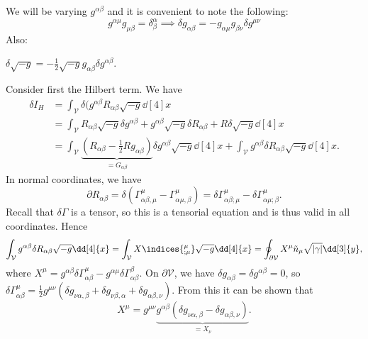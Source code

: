 \documentclass{jknotes}
\begin{document}
We will be varying \(g^{\alpha\beta}\) and it is convenient to note the following:
\begin{equation}
    g^{\alpha\mu}g_{\mu\beta} = \delta^\alpha_\beta \implies \delta g_{\alpha\beta} = -g_{\alpha\mu}g_{\beta\nu}\delta g^{\mu\nu}
\end{equation}
Also:
\begin{lemma}
    \(\delta\sqrt{-g} = -\frac12\sqrt{-g}g_{\alpha\beta}\delta g^{\alpha\beta}\).
\end{lemma}

Consider first the Hilbert term. We have
\begin{align}
    \delta I_H &= \int_{\mathcal{V}} \delta(g^{\alpha\beta}R_{\alpha\beta}\sqrt{-g}\dd[4]{x} \\
               &= \int_{\mathcal{V}} R_{\alpha\beta} \sqrt{-g} \delta g^{\alpha\beta} + g^{\alpha\beta}\sqrt{-g}\delta R_{\alpha\beta} + R \delta\sqrt{-g}\dd[4]{x} \\
               &= \int_{\mathcal{V}} \underbrace{(R_{\alpha\beta}-\frac12 R g_{\alpha\beta})}_{=G_{\alpha\beta}}\delta g^{\alpha\beta}\sqrt{-g}\dd[4]{x} + \int_{\mathcal{V}}g^{\alpha\beta}\delta R_{\alpha\beta}\sqrt{-g}\dd[4]{x}.
\end{align}
In normal coordinates, we have
\begin{equation}
    \partial R_{\alpha\beta} = \delta(\Gamma^\mu_{\alpha\beta,\mu} - \Gamma^\mu_{\alpha\mu,\beta}) = \delta\Gamma^\mu_{\alpha\beta;\mu} - \delta\Gamma^\mu_{\alpha\mu;\beta}.
\end{equation}
Recall that \(\delta\Gamma\) is a tensor, so this is a tensorial equation and is thus valid in all coordinates. Hence
\begin{equation}
    \int_{\mathcal{V}}g^{\alpha\beta}\delta R_{\alpha\beta}\sqrt{-g}\dd[4]{x} = \int_{\mathcal{V}} X\indices{^\mu_{;\mu}} \sqrt{-g}\dd[4]{x} = \oint_{\partial\mathcal{V}}X^\mu\tilde{n}_\mu\sqrt{|\gamma|}\dd[3]{y},
\end{equation}
where \(X^\mu = g^{\alpha\beta}\delta\Gamma^\mu_{\alpha\beta} - g^{\alpha\mu}\delta\Gamma^\beta_{\alpha\beta}\). On \(\partial\mathcal{V}\), we have \(\delta g_{\alpha\beta} = \delta g^{\alpha\beta} = 0\), so \(\delta\Gamma^\mu_{\alpha\beta} = \frac12 g^{\mu\nu}(\delta g_{\nu\alpha,\beta} + \delta g_{\nu\beta,\alpha} + \delta g_{\alpha\beta,\nu})\). From this it can be shown that
\begin{equation}
    X^\mu = g^{\mu\nu}\underbrace{g^{\alpha\beta}(\delta g_{\nu\alpha,\beta} - \delta g_{\alpha\beta,\nu})}_{=X_\nu}.
\end{equation}
\end{document}
